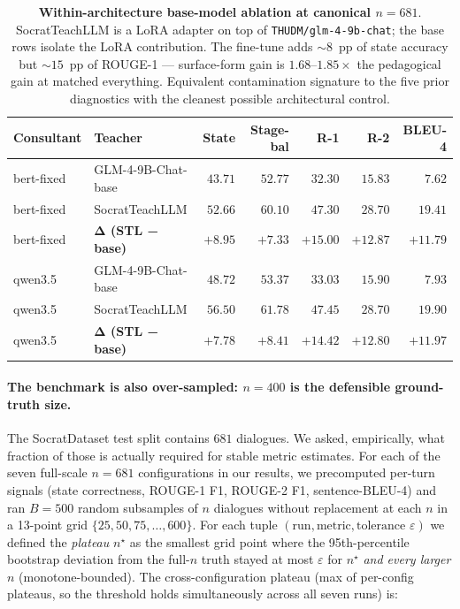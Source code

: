 \documentclass[11pt]{article}
\begin{document}
\begin{table}[t]
\centering
\small
\begin{tabular}{llrrrrr}
\toprule
Consultant & Teacher & State & Stage-bal & R-1 & R-2 & BLEU-4 \\
\midrule
bert-fixed & GLM-4-9B-Chat-base & $43.71$ & $52.77$ & $32.30$ & $15.83$ & $\phantom{0}7.62$ \\
bert-fixed & SocratTeachLLM & $52.66$ & $60.10$ & $47.30$ & $28.70$ & $19.41$ \\
bert-fixed & \textbf{Δ (STL − base)} & $\mathbf{+8.95}$ & $\mathbf{+7.33}$ & $\mathbf{+15.00}$ & $\mathbf{+12.87}$ & $\mathbf{+11.79}$ \\
\midrule
qwen3.5 & GLM-4-9B-Chat-base & $48.72$ & $53.37$ & $33.03$ & $15.90$ & $\phantom{0}7.93$ \\
qwen3.5 & SocratTeachLLM & $56.50$ & $61.78$ & $47.45$ & $28.70$ & $19.90$ \\
qwen3.5 & \textbf{Δ (STL − base)} & $\mathbf{+7.78}$ & $\mathbf{+8.41}$ & $\mathbf{+14.42}$ & $\mathbf{+12.80}$ & $\mathbf{+11.97}$ \\
\bottomrule
\end{tabular}
\caption{\textbf{Within-architecture base-model ablation at canonical $n{=}681$}. SocratTeachLLM is a LoRA adapter on top of \texttt{THUDM/glm-4-9b-chat}; the base rows isolate the LoRA contribution. The fine-tune adds $\sim$$8$~pp of state accuracy but $\sim$$15$~pp of ROUGE-1 --- surface-form gain is $1.68$--$1.85\times$ the pedagogical gain at matched everything. Equivalent contamination signature to the five prior diagnostics with the cleanest possible architectural control.}
\label{tab:base-ablation}
\end{table}

\paragraph{The benchmark is also over-sampled: $n{=}400$ is the defensible ground-truth size.} The SocratDataset test split contains $681$ dialogues. We asked, empirically, what fraction of those is actually required for stable metric estimates. For each of the seven full-scale $n{=}681$ configurations in our results, we precomputed per-turn signals (state correctness, ROUGE-1 F1, ROUGE-2 F1, sentence-BLEU-4) and ran $B{=}500$ random subsamples of $n$ dialogues without replacement at each $n$ in a 13-point grid $\{25, 50, 75, \ldots, 600\}$. For each tuple $(\text{run}, \text{metric}, \text{tolerance } \varepsilon)$ we defined the \emph{plateau} $n^\star$ as the smallest grid point where the 95th-percentile bootstrap deviation from the full-$n$ truth stayed at most $\varepsilon$ for $n^\star$ \emph{and every larger $n$} (monotone-bounded). The cross-configuration plateau (max of per-config plateaus, so the threshold holds simultaneously across all seven runs) is:
\end{document}
